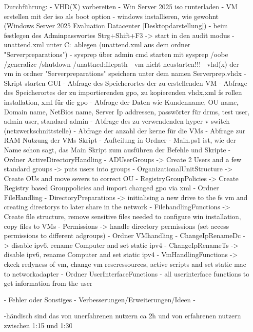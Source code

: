 \documentclass[conference]{IEEEtran}
\begin{document}
Durchführung:
- VHD(X) vorbereiten
    - Win Server 2025 iso runterladen
    - VM erstellen mit der iso als boot option
    - windows installieren, wie gewohnt (Windows Server 2025 Evaluation Datacenter [Desktopdarstellung])
    - beim festlegen des Adminpasswortes Strg+Shift+F3 -> start in den audit modus
    - unattend.xml unter C:\ ablegen (unattend.xml aus dem ordner "Serverpreparations")
    - sysprep über admin cmd starten mit sysprep /oobe /generalize /shutdown /unattned:filepath
    - vm nicht neustarten!!!
    - vhd(x) der vm in ordner "Serverpreparations" speichern unter dem namen Serverprep.vhdx
- Skript starten
    GUI
    - Abfrage des Speicherortes der zu erstellenden VM
    - Abfrage des Speicherortes der zu importierenden gpo, zu kopierenden vhdx,xml fs rollen installation, xml für die gpo
    - Abfrage der Daten wie Kundenname, OU name, Domain name, NetBios name, Server Ip addressen, passwörter für drms, test user, admin user, standard admin
    - Abfrage des zu verwendenden hyper v switch (netzwerkschnittstelle) 
    - Abfrage der anzahl der kerne für die VMs
    - Abfrage zur RAM Nutzung der VMs
    Skript
        - Aufteilung in Ordner 
        - Main.ps1 ist, wie der Name schon sagt, das Main Skript zum ausführen der Befehle und Skripte 
    - Ordner ActiveDirectoryHandling
        - ADUserGroups -> Create 2 Users and a few standard groups -> puts users into groups
        - OrganizationalUnitStructure -> Create OUs and move severs to correct OU
        - RegistryGroupPolicies -> Create Registry based Grouppolicies and import changed gpo via xml
    - Ordner FileHandling
        - DirectoryPreparations -> initialising a new drive to the fs vm and creating directorys to later share in the network
        - FilehandlingFunctions -> Create file structure, remove sensitive files needed to configure win installation, copy files to VMs
        - Permissions -> handle directory permissions (set access permissions to different adgroups)
    - Ordner VMhandling
        - ChangeIpRenameDc -> disable ipv6, rename Computer and set static ipv4
        - ChangeIpRenameTs -> disable ipv6, rename Computer and set static ipv4
        - VmHandlingFunctions -> ckeck redyness of vm, change vm rescressources, active scripts and set static mac to networkadapter 
    - Ordner UserInterfaceFunctions
        - all userinterface functions to get information from the user
    
- Fehler oder Sonstiges
- Verbesserungen/Erweiterungen/Ideen
    - 


    -händisch sind das von unerfahrenen nutzern ca 2h und von erfahrenen nutzern zwischen 1:15 und 1:30
\end{document}
